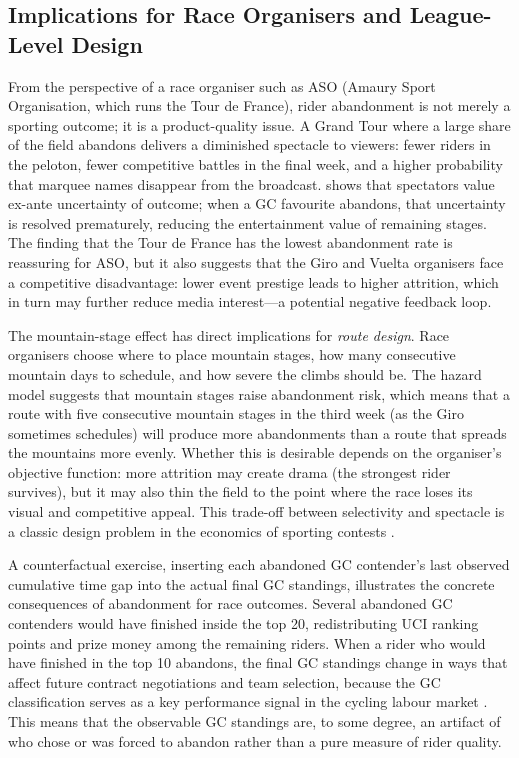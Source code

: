 \subsection{Implications for Race Organisers and League-Level Design}

From the perspective of a race organiser such as ASO (Amaury Sport Organisation, which runs the Tour de France), rider abandonment is not merely a sporting outcome; it is a product-quality issue. A Grand Tour where a large share of the field abandons delivers a diminished spectacle to viewers: fewer riders in the peloton, fewer competitive battles in the final week, and a higher probability that marquee names disappear from the broadcast. \textcite{courty2003ticketresale} shows that spectators value ex-ante uncertainty of outcome; when a GC favourite abandons, that uncertainty is resolved prematurely, reducing the entertainment value of remaining stages. The finding that the Tour de France has the lowest abandonment rate is reassuring for ASO, but it also suggests that the Giro and Vuelta organisers face a competitive disadvantage: lower event prestige leads to higher attrition, which in turn may further reduce media interest---a potential negative feedback loop.

The mountain-stage effect has direct implications for \emph{route design}. Race organisers choose where to place mountain stages, how many consecutive mountain days to schedule, and how severe the climbs should be. The hazard model suggests that mountain stages raise abandonment risk, which means that a route with five consecutive mountain stages in the third week (as the Giro sometimes schedules) will produce more abandonments than a route that spreads the mountains more evenly. Whether this is desirable depends on the organiser's objective function: more attrition may create drama (the strongest rider survives), but it may also thin the field to the point where the race loses its visual and competitive appeal. This trade-off between selectivity and spectacle is a classic design problem in the economics of sporting contests \parencite{szymanski2003economicdesign}.

A counterfactual exercise, inserting each abandoned GC contender's last observed cumulative time gap into the actual final GC standings, illustrates the concrete consequences of abandonment for race outcomes. Several abandoned GC contenders would have finished inside the top 20, redistributing UCI ranking points and prize money among the remaining riders. When a rider who would have finished in the top 10 abandons, the final GC standings change in ways that affect future contract negotiations and team selection, because the GC classification serves as a key performance signal in the cycling labour market \parencite{boeri2008italianjob}. This means that the observable GC standings are, to some degree, an artifact of who chose or was forced to abandon rather than a pure measure of rider quality.

